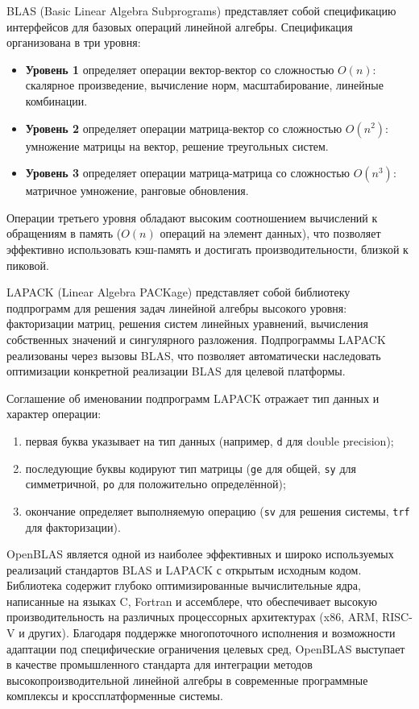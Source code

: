\documentclass[12pt, oneside]{book}
\begin{document}
    \quad BLAS (Basic Linear Algebra Subprograms) представляет собой спецификацию интерфейсов для базовых операций линейной алгебры. Спецификация организована в три уровня:
    \begin{itemize}
    \item \textbf{Уровень 1} определяет операции вектор-вектор со сложностью $O(n)$: скалярное произведение, вычисление норм, масштабирование, линейные комбинации.
    \item \textbf{Уровень 2} определяет операции матрица-вектор со сложностью $O(n^2)$: умножение матрицы на вектор, решение треугольных систем.
    \item \textbf{Уровень 3} определяет операции матрица-матрица со сложностью $O(n^3)$: матричное умножение, ранговые обновления.
    \end{itemize}
    Операции третьего уровня обладают высоким соотношением вычислений к обращениям в память ($O(n)$ операций на элемент данных), что позволяет эффективно использовать кэш-память и достигать производительности, близкой к пиковой.
        
    \quad LAPACK (Linear Algebra PACKage) представляет собой библиотеку подпрограмм для решения задач линейной алгебры высокого уровня: факторизации матриц, решения систем линейных уравнений, вычисления собственных значений и сингулярного разложения. Подпрограммы LAPACK реализованы через вызовы BLAS, что позволяет автоматически наследовать оптимизации конкретной реализации BLAS для целевой платформы. 

    Соглашение об именовании подпрограмм LAPACK отражает тип данных и характер операции: 
    \begin{enumerate}
        \item первая буква указывает на тип данных (например, \texttt{d} для double precision);
        \item последующие буквы кодируют тип матрицы (\texttt{ge} для общей, \texttt{sy} для симметричной, \texttt{po} для положительно определённой);
        \item окончание определяет выполняемую операцию (\texttt{sv} для решения системы, \texttt{trf} для факторизации).
    \end{enumerate}
    
    \quad OpenBLAS является одной из наиболее эффективных и широко используемых реализаций стандартов BLAS и LAPACK с открытым исходным кодом. Библиотека содержит глубоко оптимизированные вычислительные ядра, написанные на языках C, Fortran и ассемблере, что обеспечивает высокую производительность на различных процессорных архитектурах (x86, ARM, RISC-V и других). Благодаря поддержке многопоточного исполнения и возможности адаптации под специфические ограничения целевых сред, OpenBLAS выступает в качестве промышленного стандарта для интеграции методов высокопроизводительной линейной алгебры в современные программные комплексы и кроссплатформенные системы.
    
\end{document}
